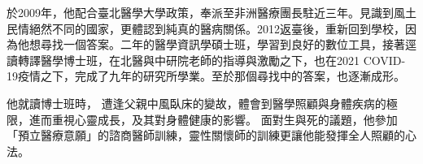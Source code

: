 \documentclass{letter}
\begin{document}
\begin{letter}

於2009年，他配合臺北醫學大學政策，奉派至非洲醫療團長駐近三年。見識到風土民情絕然不同的國家，更體認到純真的醫病關係。2012返臺後，重新回到學校，因為他想尋找一個答案。二年的醫學資訊學碩士班，學習到良好的數位工具，接著逕讀轉譯醫學博士班，在北醫與中研院老師的指導與激勵之下，也在2021 COVID-19疫情之下，完成了九年的研究所學業。至於那個尋找中的答案，也逐漸成形。


他就讀博士班時，%
遭逢父親中風臥床的變故，體會到醫學照顧與身體疾病的極限，進而重視心靈成長，及其對身體健康的影響。%
面對生與死的議題，他參加「預立醫療意願」的諮商醫師訓練，靈性關懷師的訓練更讓他能發揮全人照顧的心法。


\end{letter}
\end{document}
